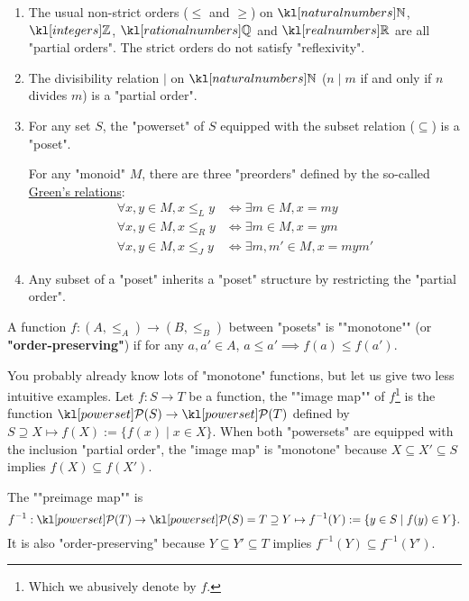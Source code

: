 \documentclass[main.tex]{subfiles}
\begin{document}
\begin{exmps}
    \begin{enumerate}
        \item The usual non-strict orders ($\leq$ and $\geq$) on $\N$, $\Z$, $\Q$ and $\R$ are all "partial orders". The strict orders do not satisfy "reflexivity".
        \item The divisibility relation $\mid$ on $\N$ ($n \mid m$ if and only if $n$ divides $m$) is a "partial order".
        \item For any set $S$, the "powerset" of $S$  equipped with the subset relation ($\subseteq$) is a "poset".\begin{marginfigure}For any "monoid" $M$, there are three "preorders" defined by the so-called \href{https://en.wikipedia.org/wiki/Green%27s_relations}{Green's relations}:
        \begin{align*}
            \forall x,y \in M, x\leq_L y &\Leftrightarrow \exists m \in M, x = my\\
            \forall x,y \in M, x\leq_R y &\Leftrightarrow \exists m \in M, x = ym\\
            \forall x,y \in M, x\leq_J y &\Leftrightarrow \exists m,m' \in M, x = mym'
        \end{align*}\end{marginfigure}
        \item Any subset of a "poset" inherits a "poset" structure by restricting the "partial order".
    \end{enumerate}
\end{exmps}
\begin{defn}[Monotone]
	\AP A function $f:(A, \leq_A) \rightarrow (B,\leq_B)$ between "posets" is ""monotone"" (or \textbf{"order-preserving"}) if for any $a, a' \in A$, $a \leq a' \implies f(a) \leq f(a')$.
\end{defn}
\begin{exmp}
    You probably already know lots of "monotone" functions, but let us give two less intuitive examples. \AP Let $f: S \rightarrow T$ be a function, the ""image map"" of $f$\footnote{Which we abusively denote by $f$.} is the function $\mP(S) \rightarrow \mP(T)$ defined by $S \supseteq X\mapsto f(X) := \{f(x) \mid x\in X\}$. When both "powersets" are equipped with the inclusion "partial order", the "image map" is "monotone" because $X \subseteq X'\subseteq S$ implies $f(X) \subseteq f(X')$.

    \AP The ""preimage map"" is \[f^{-1}: \mP(T) \rightarrow \mP(S) = T \supseteq Y \mapsto f^{-1}(Y) := \{y \in S \mid f(y) \in Y\}.\]
    It is also "order-preserving" because $Y \subseteq Y'\subseteq T$ implies $f^{-1}(Y) \subseteq f^{-1}(Y')$.
\end{exmp}
\end{document}
